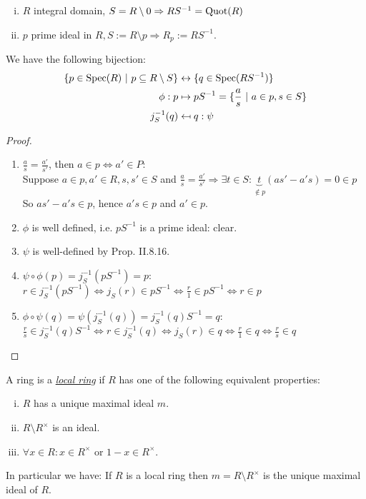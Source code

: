\begin{Bsp}
\begin{enumerate}[(i)]
\item $R$ integral domain, $S=R\setminus{0} \Rightarrow RS^{-1}=\operatorname{Quot}(R)$
\item $p$ prime ideal in $R, S:= R \setminus p \Rightarrow R_p:=RS^{-1}$.
\end{enumerate}
\end{Bsp}

\begin{Prop}
We have the following bijection:
\begin{align*}
\{p \in \operatorname{Spec}(R) \ | \ p \subseteq R \setminus S\}  &\leftrightarrow \{q \in \operatorname{Spec}(RS^{-1})\}\\
\phi: p &\mapsto pS^{-1} = \{\frac{a}{s} \ | \ a \in p, s \in S \}\\
j_S^{-1}(q) &\mapsfrom q : \psi\\
\end{align*}
\end{Prop}

\begin{proof}
\begin{enumerate}[(1)]
\item $\frac{a}{s}=\frac{a'}{s'}$, then $a \in p \iff a' \in P:$\\
Suppose $a \in p, a' \in R, s,s' \in S$ and $\frac{a}{s}=\frac{a'}{s'} \Rightarrow \exists t \in S: \underbrace{t}_{\not\in p} (as'-a's)=0 \in p$\\
So $as'-a's \in p$, hence $a's \in p$ and $a' \in p$.
\item $\phi$ is well defined, i.e. $pS^{-1}$ is a prime ideal: clear.
\item $\psi$ is well-defined by Prop. II.8.16.
\item $\psi\circ\phi(p)=j_S^{-1}(pS^{-1})=p:$\\
$r \in j_S^{-1}(pS^{-1}) \iff j_S(r) \in pS^{-1} \iff \frac{r}{1} \in pS^{-1} \iff r \in p$
\item $\phi \circ \psi(q)=\psi(j_S^{-1}(q))=j_S^{-1}(q)S^{-1}=q:$\\
$\frac{r}{s} \in j_S^{-1}(q)S^{-1} \iff r \in j_S^{-1}(q) \iff j_S(r) \in q \iff \frac{r}{1} \in q \iff \frac{r}{s} \in q$
\end{enumerate}
\end{proof}

\begin{defi}
A ring is a \emph{\underline{local ring}} if $R$ has one of the following equivalent properties:
\begin{enumerate}[(i)]
\item $R$ has a unique maximal ideal $m$.
\item $R \setminus R^\times$ is an ideal.
\item $\forall x \in R: x \in R^\times$ or $1-x \in R^\times$.
\end{enumerate}
In particular we have: If $R$ is a local ring then $m=R \setminus R^\times$ is the unique maximal ideal of $R$.
\end{defi}

